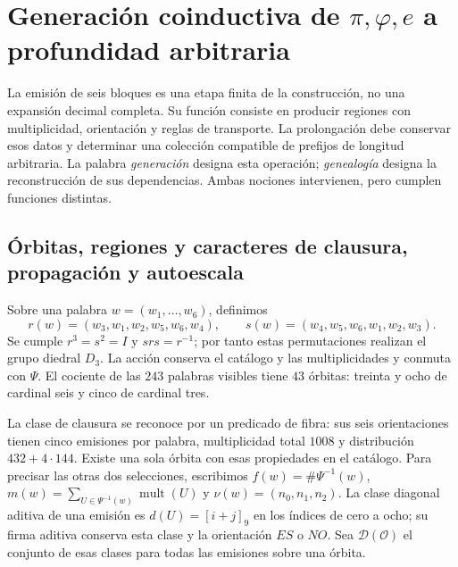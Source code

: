 \section{Generación coinductiva de \texorpdfstring{\(\pi,\varphi,e\)}{pi, phi, e} a profundidad arbitraria}
\label{sec:generacion}

La emisión de seis bloques es una etapa finita de la construcción, no una expansión decimal completa. Su función consiste en producir regiones con multiplicidad, orientación y reglas de transporte. La prolongación debe conservar esos datos y determinar una colección compatible de prefijos de longitud arbitraria. La palabra \emph{generación} designa esta operación; \emph{genealogía} designa la reconstrucción de sus dependencias. Ambas nociones intervienen, pero cumplen funciones distintas.

\subsection{Órbitas, regiones y caracteres de clausura, propagación y autoescala}

Sobre una palabra \(w=(w_1,\ldots,w_6)\), definimos
\[
 r(w)=(w_3,w_1,w_2,w_5,w_6,w_4),\qquad
 s(w)=(w_4,w_5,w_6,w_1,w_2,w_3).
\]
Se cumple \(r^3=s^2=I\) y \(srs=r^{-1}\); por tanto estas permutaciones realizan el grupo diedral \(D_3\). La acción conserva el catálogo y las multiplicidades y conmuta con \(\Psi\). El cociente de las \(243\) palabras visibles tiene \(43\) órbitas: treinta y ocho de cardinal seis y cinco de cardinal tres.

La clase de clausura se reconoce por un predicado de fibra: sus seis orientaciones tienen cinco emisiones por palabra, multiplicidad total \(1008\) y distribución \(432+4\cdot144\). Existe una sola órbita con esas propiedades en el catálogo. Para precisar las otras dos selecciones, escribimos \(f(w)=\#\Psi^{-1}(w)\), \(m(w)=\sum_{U\in\Psi^{-1}(w)}\operatorname{mult}(U)\) y \(\nu(w)=(n_0,n_1,n_2)\). La clase diagonal aditiva de una emisión es \(d(U)=[i+j]_9\) en los índices de cero a ocho; su firma aditiva conserva esta clase y la orientación \(ES\) o \(NO\). Sea \(\mathcal D(\mathcal O)\) el conjunto de esas clases para todas las emisiones sobre una órbita.

